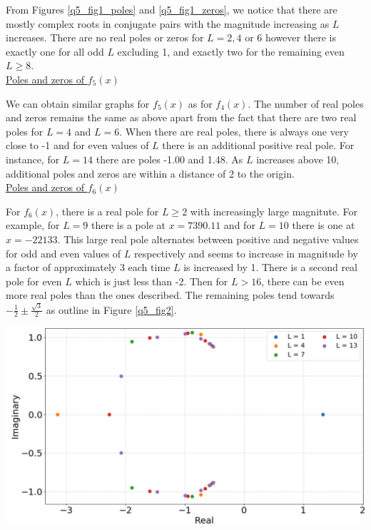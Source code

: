 \documentclass[12pt, a4paper]{article}
\begin{document}
From Figures \ref{q5_fig1_poles} and \ref{q5_fig1_zeros}, we notice that there are mostly complex roots
in conjugate pairs with the magnitude increasing as $L$ increases. There are no real poles or zeros for 
$L = 2, 4 \text{ or } 6$ however there is exactly one for all odd $L$ excluding 1, and exactly two for
the remaining even $L\geq 8$.
\\

\vspace{0.4cm}
\underline{Poles and zeros of $f_{5}(x)$}

\vspace{0.5cm}
We can obtain similar graphs for $f_{5}(x)$ as for $f_{4}(x)$. The number of real poles 
and zeros remains the same as above apart from the fact that there are two real poles 
for $L = 4$ and $L = 6$. When there are real poles, there is always one very close to 
-1 and for even values of $L$ there is an additional positive real pole. For instance, 
for $L = 14$ there are poles -1.00 and 1.48. As $L$ increases above 10, additional poles 
and zeros are within a distance of 2 to the origin.
\\

\vspace{0.4cm}
\underline{Poles and zeros of $f_{6}(x)$}

\vspace{0.5cm}
For $f_{6}(x)$, there is a real pole for $L\geq 2 $ with increasingly large magnitute. For example, for 
$L = 9$ there is a pole at $x=7390.11$ and for $L=10$ there is one at $x=-22133$. This large real pole 
alternates between positive and negative values for odd and even values of $L$ respectively and seems
to increase in magnitude by a factor of approximately 3 each time $L$ is increased by 1. There is a 
second real pole for even $L$ which is just less than -2. Then for $L > 16$, there can be even more real
poles than the ones described. The remaining poles tend towards 
$-\frac{1}{2} \pm \frac{\sqrt{3}}{2}$ as outline in Figure \ref{q5_fig2}.
\\

\begin{minipage}{\textwidth}
	\centering
	\includegraphics[width=0.9\linewidth]{q5_fig2_v2}

	\vspace*{-0.2cm}

	\label{q5_fig2}
\end{minipage}
\vspace{0.3cm}
\end{document}
